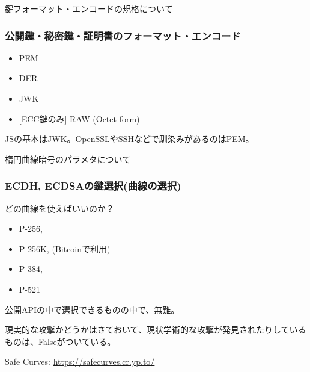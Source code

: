 \documentclass[12pt,dvipdfmx]{beamer}
\newcommand{\backupbegin}{
   \newcounter{framenumberappendix}
   \setcounter{framenumberappendix}{\value{framenumber}}
}
\newcommand{\backupend}{
   \addtocounter{framenumberappendix}{-\value{framenumber}}
   \addtocounter{framenumber}{\value{framenumberappendix}} 
}
\begin{document}
\begin{frame}
\centering
{\Large 鍵フォーマット・エンコードの規格について}
\end{frame}

\begin{frame}
\frametitle{公開鍵・秘密鍵・証明書のフォーマット・エンコード}
\begin{itemize}
 \item PEM
 \item DER
 \item JWK
 \item {[ECC鍵のみ]}  RAW (Octet form)
\end{itemize}
JSの基本はJWK。OpenSSLやSSHなどで馴染みがあるのはPEM。
\end{frame}

\begin{frame}
\centering
{\Large 楕円曲線暗号のパラメタについて}
\end{frame}


\begin{frame}
\frametitle{ECDH, ECDSAの鍵選択(曲線の選択)}
どの曲線を使えばいいのか？
\begin{itemize}
 \item P-256,
 \item P-256K, (Bitcoinで利用)
 \item P-384,
 \item P-521
\end{itemize}
公開APIの中で選択できるものの中で、無難。

現実的な攻撃かどうかはさておいて、現状学術的な攻撃が発見されたりしているものは、Falseがついている。

Safe Curves: \url{https://safecurves.cr.yp.to/}
\end{frame}







 

\end{document}
